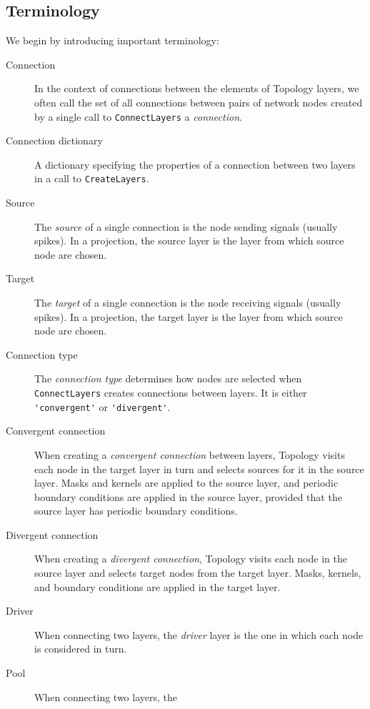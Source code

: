 \documentclass[a4paper,12pt]{report}
\begin{document}
\subsection{Terminology}\label{sec:terminology}
We begin by introducing important terminology:
\begin{description}
\item[Connection] In the context of connections
  between the elements of Topology layers, we often call the set of all connections
  between pairs of network nodes created by a single call to
  \lstinline!ConnectLayers! a \emph{connection}.
\item[Connection dictionary] A dictionary
  specifying the properties of a connection between two layers in a call to
  \lstinline!CreateLayers!.
\item[Source] The \emph{source} of a single connection
  is the node sending signals (usually spikes). In a projection, the
  source layer is the layer from which source node
  are chosen.
\item[Target]
The \emph{target} of a single connection
  is the node receiving signals (usually spikes). In a projection, the
  target layer is the layer from which source node
  are chosen.
\item[Connection type] The \emph{connection
    type} determines how nodes are selected when
  \lstinline!ConnectLayers! creates connections between layers. It is
  either \lstinline!'convergent'! or \lstinline!'divergent'!.
\item[Convergent connection] When
  creating a \emph{convergent connection} between layers, Topology
  visits each node in the target layer in turn and selects sources for
  it in the source layer. Masks and kernels are applied to the source
  layer, and periodic boundary conditions are applied in the source
  layer, provided that the source layer has periodic boundary conditions.
\item[Divergent connection] When creating
  a \emph{divergent connection}, Topology visits each node in the
  source layer and selects target nodes from the target layer. Masks, kernels, and
  boundary conditions are applied in the target layer.
\item[Driver] When connecting two layers, the
  \emph{driver} layer is the one in which each node is considered in
  turn. 
\item[Pool] When connecting two layers, the

\end{description}
\end{document}
